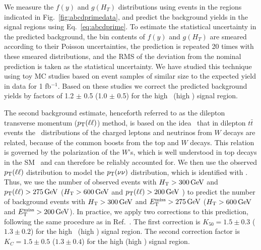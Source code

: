 We measure the $f(y)$ and $g(H_T)$ distributions using events in the regions indicated in Fig.~\ref{fig:abcdprimedata},
and predict the background yields in the signal regions using Eq.~\ref{eq:abcdprime}.
To estimate the statistical uncertainty in the predicted background, the bin contents
of $f(y)$ and $g(H_T)$ are smeared according to their Poisson uncertainties, the prediction is repeated 20 times
with these smeared distributions, and the RMS of the deviation from the nominal prediction is taken
as the statistical uncertainty. We have studied this technique using toy MC studies based on
event samples of similar size to the expected yield in data for 1 fb$^{-1}$.
Based on these studies we correct the predicted background yields by factors of 1.2 $\pm$ 0.5
(1.0 $\pm$ 0.5) for the high \MET\ (high \Ht) signal region.


The second  background estimate, henceforth referred to as the dilepton transverse momentum ($p_{\mathrm{T}}(\ell\ell)$) method, 
is  based on the  idea~\cite{ref:victory} that  in dilepton  $t\bar{t}$  events the
\pt\  distributions of  the charged  leptons and  neutrinos  from $W$
decays are  related, because of the  common boosts from  the top  and $W$
decays.  This relation  is governed by the polarization  of the $W$'s,
which         is         well         understood        in         top
decays in the SM~\cite{Wpolarization,Wpolarization2}   and   can  therefore   be
reliably  accounted   for.   We then  use   the  observed
$p_{\mathrm{T}}(\ell\ell)$ distribution to  model the $p_{\mathrm{T}}(\nu\nu)$ distribution,
which is  identified with \MET.  Thus,  we use the  number of observed
events  with $H_{\mathrm{T}} > 300\,\text{Ge\hspace{-.08em}V}$ and $p_{\mathrm{T}}(\ell\ell)  > 275\,\text{Ge\hspace{-.08em}V}$ 
($H_{\mathrm{T}} > 600\,\text{Ge\hspace{-.08em}V}$ and $p_{\mathrm{T}}(\ell\ell)  > 200\,\text{Ge\hspace{-.08em}V}$ )
to predict the  number of  background events  with 
$H_{\mathrm{T}} >  300\,\text{Ge\hspace{-.08em}V}$ and  $E_{\mathrm{T}}^{\text{miss}} > 275\,\text{Ge\hspace{-.08em}V}$ ($H_{\mathrm{T}} >  600\,\text{Ge\hspace{-.08em}V}$ and  $E_{\mathrm{T}}^{\text{miss}} > 200\,\text{Ge\hspace{-.08em}V}$).  
In  practice, we apply two corrections to this prediction, following the same procedure as in Ref.~\cite{ref:ospaper}.
The first correction is $K_{50}=1.5 \pm 0.3$ ($1.3 \pm 0.2$) for the high \MET\ (high \Ht) signal region.
The  second correction factor  is $K_C  = 1.5  \pm 0.5$ ($1.3 \pm 0.4$) for the
high \MET (high \Ht) signal region.

